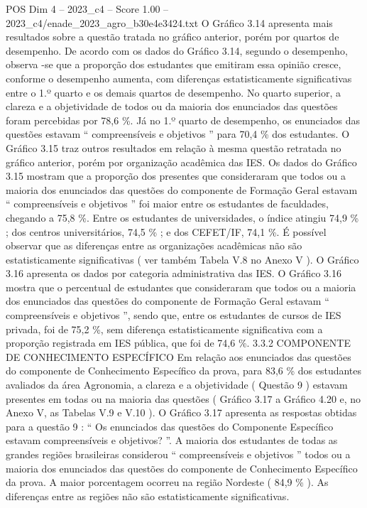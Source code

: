\begin{textsample}{POS Dim 4 – 2023\_c4 – Score 1.00 – 2023\_c4/enade\_2023\_agro\_b30e4e3424.txt}
O Gráfico 3.14 apresenta mais resultados sobre a questão tratada no gráfico anterior, porém por quartos de desempenho.
De acordo com os dados do Gráfico 3.14, segundo o desempenho, observa -se que a proporção dos estudantes que emitiram essa opinião cresce, conforme o desempenho aumenta, com diferenças estatisticamente significativas entre o 1.º quarto e os demais quartos de desempenho.
No quarto superior, a clareza e a objetividade de todos ou da maioria dos enunciados das questões foram percebidas por 78,6 \%.
Já no 1.º quarto de desempenho, os enunciados das questões estavam “ compreensíveis e objetivos ” para 70,4 \% dos estudantes.
O Gráfico 3.15 traz outros resultados em relação à mesma questão retratada no gráfico anterior, porém por organização acadêmica das IES.
Os dados do Gráfico 3.15 mostram que a proporção dos presentes que consideraram que todos ou a maioria dos enunciados das questões do componente de Formação Geral estavam “ compreensíveis e objetivos ” foi maior entre os estudantes de faculdades, chegando a 75,8 \%.
Entre os estudantes de universidades, o índice atingiu 74,9 \% ; dos centros universitários, 74,5 \% ; e dos CEFET/IF, 74,1 \%.
É possível observar que as diferenças entre as organizações acadêmicas não são estatisticamente significativas ( ver também Tabela V.8 no Anexo V ).
O Gráfico 3.16 apresenta os dados por categoria administrativa das IES.
O Gráfico 3.16 mostra que o percentual de estudantes que consideraram que todos ou a maioria dos enunciados das questões do componente de Formação Geral estavam “ compreensíveis e objetivos ”, sendo que, entre os estudantes de cursos de IES privada, foi de 75,2 \%, sem diferença estatisticamente significativa com a proporção registrada em IES pública, que foi de 74,6 \%. 3.3.2 COMPONENTE DE CONHECIMENTO ESPECÍFICO Em relação aos enunciados das questões do componente de Conhecimento Específico da prova, para 83,6 \% dos estudantes avaliados da área Agronomia, a clareza e a objetividade ( Questão 9 ) estavam presentes em todas ou na maioria das questões ( Gráfico 3.17 a Gráfico 4.20 e, no Anexo V, as Tabelas V.9 e V.10 ).
O Gráfico 3.17 apresenta as respostas obtidas para a questão 9 : “ Os enunciados das questões do Componente Específico estavam compreensíveis e objetivos? ”.
A maioria dos estudantes de todas as grandes regiões brasileiras considerou “ compreensíveis e objetivos ” todos ou a maioria dos enunciados das questões do componente de Conhecimento Específico da prova.
A maior porcentagem ocorreu na região Nordeste ( 84,9 \% ).
As diferenças entre as regiões não são estatisticamente significativas.

\end{textsample}
